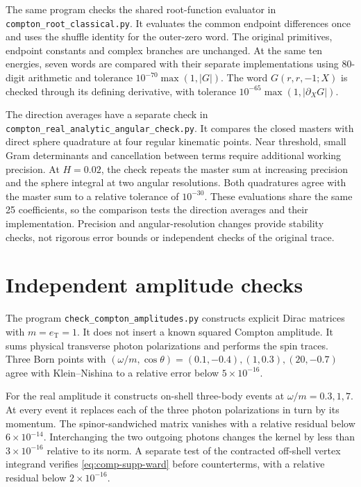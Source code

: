The same program checks the shared root-function evaluator in
\nolinkurl{compton_root_classical.py}. It evaluates the common endpoint
differences once and uses the shuffle identity for the outer-zero word.
The original primitives, endpoint constants and complex branches are
unchanged. At the same ten energies, seven words are compared with their
separate implementations using 80-digit arithmetic and tolerance
$10^{-70}\max(1,|G|)$. The word $G(r,r,-1;X)$ is checked through its
defining derivative, with tolerance $10^{-65}\max(1,|\partial_XG|)$.

The direction averages have a separate check in
\nolinkurl{compton_real_analytic_angular_check.py}. It compares the closed
masters with direct sphere quadrature at four regular kinematic points.
Near threshold, small Gram determinants and cancellation between terms
require additional working precision. At $H=0.02$, the check repeats the
master sum at increasing precision and the sphere integral at two angular
resolutions. Both quadratures agree with the master sum to a relative
tolerance of $10^{-30}$. These evaluations share the same 25 coefficients,
so the comparison tests the direction averages and their implementation.
Precision and angular-resolution changes provide stability checks,
not rigorous error bounds or independent checks of the original trace.

\section{Independent amplitude checks}
The program \texttt{check\_compton\_amplitudes.py} constructs explicit
Dirac matrices with $m=e_{\mathrm T}=1$. It does not insert a known
squared Compton amplitude. It sums physical transverse photon
polarizations and performs the spin traces. Three Born points with
$(\omega/m,\cos\theta)=(0.1,-0.4),(1,0.3),(20,-0.7)$ agree with
Klein--Nishina to a relative error below $5\times10^{-16}$.

For the real amplitude it constructs on-shell three-body events
at $\omega/m=0.3,1,7$. At every event it replaces each of the three
photon polarizations in turn by its momentum. The spinor-sandwiched
matrix vanishes with a relative residual below $6\times10^{-14}$.
Interchanging the two outgoing photons changes the kernel by less
than $3\times10^{-16}$ relative to its norm. A separate test of the
contracted off-shell vertex integrand verifies
\eqref{eq:comp-supp-ward} before counterterms, with a relative
residual below $2\times10^{-16}$.

